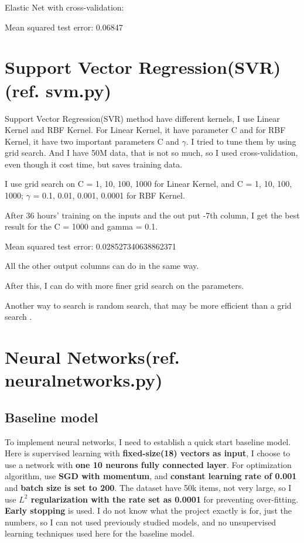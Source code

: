 \documentclass[12pt]{article}
\numberwithin{equation}{section}
\begin{document}
Elastic Net with cross-validation:

Mean squared test error: 0.06847


\section{Support Vector Regression(SVR)(ref. svm.py)}
Support Vector Regression(SVR) method have different kernels, I use Linear Kernel and RBF Kernel. For Linear Kernel, it have parameter C and for RBF Kernel, it have two important parameters C and $\gamma$. I tried to tune them by using grid search. And I have 50M data, that is not so much, so I used cross-validation, even though it cost time, but saves training data\cite{hsu2003practical}.

I use grid search on C = 1, 10, 100, 1000 for Linear Kernel, and C = 1, 10, 100, 1000; $\gamma$ = 0.1, 0.01, 0.001, 0.0001 for RBF Kernel.

After 36 hours' training on the inputs and the out put -7th column, I get the best result for the C = 1000 and gamma = 0.1. 

Mean squared test error: 0.028527340638862371

All the other output columns can do in the same way.

After this, I can do with more finer grid search on the parameters.

Another way to search is random search, that may be more efficient than a grid search \cite{bergstra2012random}.

\section{Neural Networks\cite{Goodfellow-et-al-2016-Book}(ref. neuralnetworks.py)}
\subsection{Baseline model}
To implement neural networks, I need to establish a quick start baseline model. Here is supervised learning with \textbf{fixed-size(18) vectors as input}, I choose to use a network with \textbf{one 10 neurons fully connected layer}. For optimization algorithm, use \textbf{SGD with momentum}, and \textbf{constant learning rate of 0.001} and \textbf{batch size is set to 200}. The dataset have 50k items, not very large, so I use \textbf{$L^2$ regularization with the rate set as 0.0001} for preventing over-fitting.  \textbf{Early stopping} is used. I do not know what the project exactly is for, just the numbers, so I can not used previously studied models, and no unsupervised learning techniques used here for the baseline model.
\end{document}
